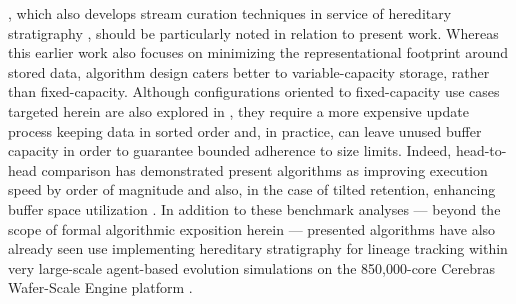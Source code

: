 
\citet{moreno2024algorithms}, which also develops stream curation techniques in service of hereditary stratigraphy \citep{moreno2022hstrat}, should be particularly noted in relation to present work.
Whereas this earlier work also focuses on minimizing the representational footprint around stored data, algorithm design caters better to variable-capacity storage, rather than fixed-capacity.
Although configurations oriented to fixed-capacity use cases targeted herein are also explored in \citet{moreno2024algorithms}, they require a more expensive update process keeping data in sorted order and, in practice, can leave unused buffer capacity in order to guarantee bounded adherence to size limits.
Indeed, head-to-head comparison has demonstrated present algorithms as improving execution speed by order of magnitude and also, in the case of tilted retention, enhancing buffer space utilization \citep{moreno2024guide,moreno2024trackable}.
In addition to these benchmark analyses --- beyond the scope of formal algorithmic exposition herein --- presented algorithms have also already seen use implementing hereditary stratigraphy for lineage tracking within very large-scale agent-based evolution simulations on the 850,000-core Cerebras Wafer-Scale Engine platform \citep{moreno2024trackable}.
